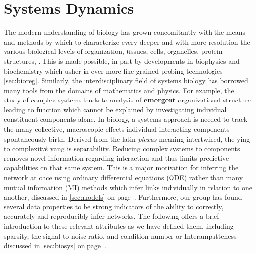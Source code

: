 
\section{Systems Dynamics}
\label{sec:sysdyn}
The modern understanding of biology has grown concomitantly with the means and methods by which to characterize every deeper and with more resolution the various biological levels of organization, \ie tissues, cells, organelles, protein structures, \etc. This is made possible, in part by developments in biophysics and biochemistry which usher in ever more fine grained probing technologies \cref{sec:bioreg}. %
Similarly, the interdisciplinary field of systems biology has borrowed many tools from the domains of mathematics and physics. For example, the study of complex systems lends to analysis of \textbf{emergent} organizational structure leading to function which cannot be explained by investigating individual constituent components alone. In biology, a systems approach is needed to track the many collective, macroscopic effects individual interacting components spontaneously birth. Derived from the latin \emph{plexus} meaning intertwined, the ying to complexity\'s yang is separability. Reducing complex systems to components removes novel information regarding interaction and thus limits predictive capabilities on that same system. This is a major motivation for inferring the network at once using ordinary differential equations (ODE) rather than many mutual information (MI) methods which infer links individually in relation to one another, discussed in \cref{sec:models} on page~\pageref{sec:models}. Furthermore, our group has found several data properties to be strong indicators of the ability to correctly, accurately and reproducibly infer networks. The following offers a brief introduction to these relevant attributes as we have defined them, including sparsity, the signal-to-noise ratio, and condition number or Interampatteness discussed in \cref{sec:biosys} on page~\pageref{sec:biosys}.



